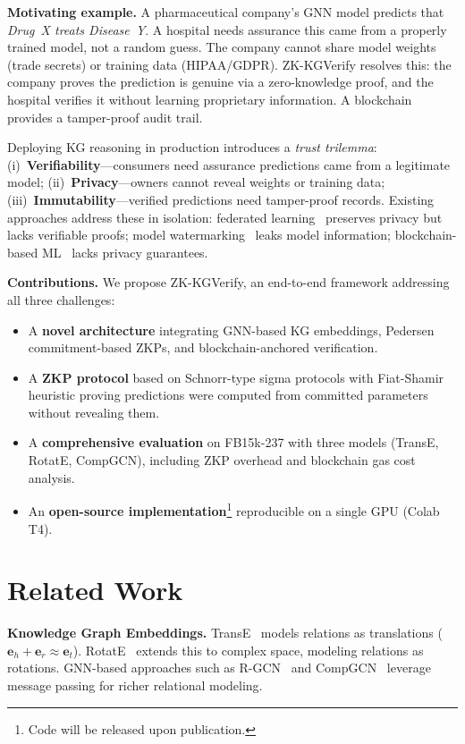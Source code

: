 \documentclass[runningheads]{llncs}
\newcommand{\embed}{\mathbf{e}}
\begin{document}
\textbf{Motivating example.} A pharmaceutical company's GNN model predicts that \emph{Drug~X treats Disease~Y}. A hospital needs assurance this came from a properly trained model, not a random guess. The company cannot share model weights (trade secrets) or training data (HIPAA/GDPR). ZK-KGVerify resolves this: the company proves the prediction is genuine via a zero-knowledge proof, and the hospital verifies it without learning proprietary information. A blockchain provides a tamper-proof audit trail.

Deploying KG reasoning in production introduces a \emph{trust trilemma}: (i)~\textbf{Verifiability}---consumers need assurance predictions came from a legitimate model; (ii)~\textbf{Privacy}---owners cannot reveal weights or training data; (iii)~\textbf{Immutability}---verified predictions need tamper-proof records. Existing approaches address these in isolation: federated learning~\cite{mcmahan2017communication} preserves privacy but lacks verifiable proofs; model watermarking~\cite{adi2018turning} leaks model information; blockchain-based ML~\cite{kurtulmus2018trustless} lacks privacy guarantees.

\textbf{Contributions.} We propose ZK-KGVerify, an end-to-end framework addressing all three challenges:
\begin{itemize}
    \item A \textbf{novel architecture} integrating GNN-based KG embeddings, Pedersen commitment-based ZKPs, and blockchain-anchored verification.
    \item A \textbf{ZKP protocol} based on Schnorr-type sigma protocols with Fiat-Shamir heuristic proving predictions were computed from committed parameters without revealing them.
    \item A \textbf{comprehensive evaluation} on FB15k-237 with three models (TransE, RotatE, CompGCN), including ZKP overhead and blockchain gas cost analysis.
    \item An \textbf{open-source implementation}\footnote{Code will be released upon publication.} reproducible on a single GPU (Colab T4).
\end{itemize}

\section{Related Work}
\label{sec:related_work}

\textbf{Knowledge Graph Embeddings.}
TransE~\cite{bordes2013translating} models relations as translations ($\embed_h + \embed_r \approx \embed_t$). RotatE~\cite{sun2019rotate} extends this to complex space, modeling relations as rotations. GNN-based approaches such as R-GCN~\cite{schlichtkrull2018modeling} and CompGCN~\cite{vashishth2020composition} leverage message passing for richer relational modeling.
\end{document}
